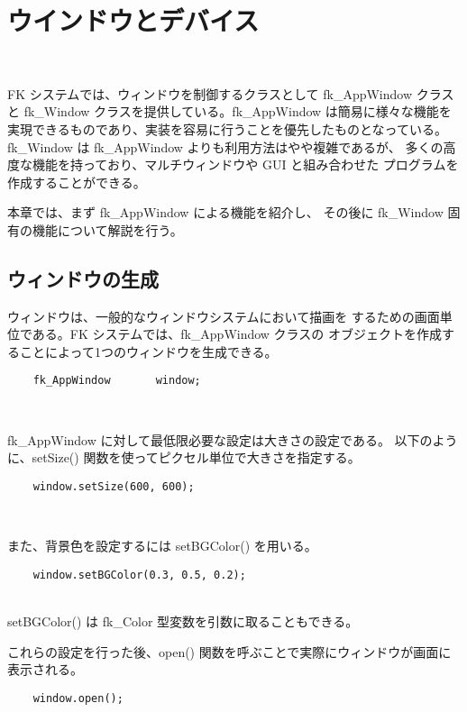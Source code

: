 \chapter{ウインドウとデバイス} \label{chap:window} ~

FK システムでは、ウィンドウを制御するクラスとして fk\_AppWindow クラスと
fk\_Window クラスを提供している。fk\_AppWindow は簡易に様々な機能を
実現できるものであり、実装を容易に行うことを優先したものとなっている。
fk\_Window は fk\_AppWindow よりも利用方法はやや複雑であるが、
多くの高度な機能を持っており、マルチウィンドウや GUI と組み合わせた
プログラムを作成することができる。

本章では、まず fk\_AppWindow による機能を紹介し、
その後に fk\_Window 固有の機能について解説を行う。

\section{ウィンドウの生成}
ウィンドウは、一般的なウィンドウシステムにおいて描画を
するための画面単位である。FK システムでは、fk\_AppWindow クラスの
オブジェクトを作成することによって1つのウィンドウを生成できる。
\\
\begin{screen}
\begin{verbatim}
    fk_AppWindow       window;
\end{verbatim}
\end{screen}
~

fk\_AppWindow に対して最低限必要な設定は大きさの設定である。
以下のように、setSize() 関数を使ってピクセル単位で大きさを指定する。
\\
\begin{screen}
\begin{verbatim}
    window.setSize(600, 600);
\end{verbatim}
\end{screen}
~

また、背景色を設定するには setBGColor() を用いる。
\\
\begin{screen}
\begin{verbatim}
    window.setBGColor(0.3, 0.5, 0.2);
\end{verbatim}
\end{screen}
~ \\
setBGColor() は fk\_Color 型変数を引数に取ることもできる。

これらの設定を行った後、open() 関数を呼ぶことで実際にウィンドウが画面に表示される。
\\
\begin{screen}
\begin{verbatim}
    window.open();
\end{verbatim}
\end{screen}
